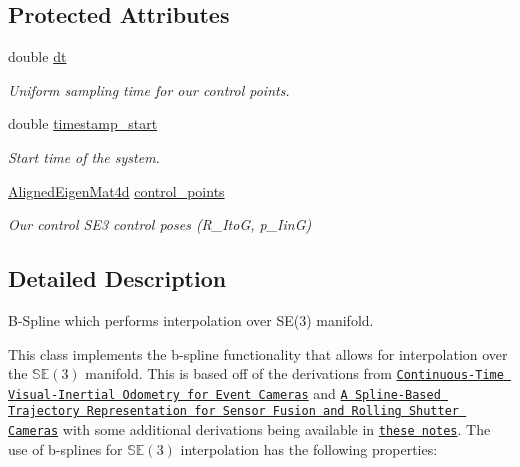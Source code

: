 \subsection*{Protected Attributes}
\begin{DoxyCompactItemize}
\item 
\mbox{\label{classov__core_1_1BsplineSE3_a48e22f59195971f19e93f27a9dd9f250}} 
double \hyperlink{classov__core_1_1BsplineSE3_a48e22f59195971f19e93f27a9dd9f250}{dt}
\begin{DoxyCompactList}\small\item\em Uniform sampling time for our control points. \end{DoxyCompactList}\item 
\mbox{\label{classov__core_1_1BsplineSE3_a3918570c18a61486c049a910c501d85a}} 
double \hyperlink{classov__core_1_1BsplineSE3_a3918570c18a61486c049a910c501d85a}{timestamp\+\_\+start}
\begin{DoxyCompactList}\small\item\em Start time of the system. \end{DoxyCompactList}\item 
\mbox{\label{classov__core_1_1BsplineSE3_a339afd2119785871db41799c3c5e2ec0}} 
\hyperlink{classov__core_1_1BsplineSE3_a2e0b3cb7cef84db7b84598f2ea01e00d}{Aligned\+Eigen\+Mat4d} \hyperlink{classov__core_1_1BsplineSE3_a339afd2119785871db41799c3c5e2ec0}{control\+\_\+points}
\begin{DoxyCompactList}\small\item\em Our control S\+E3 control poses (R\+\_\+\+ItoG, p\+\_\+\+IinG) \end{DoxyCompactList}\end{DoxyCompactItemize}


\subsection{Detailed Description}
B-\/\+Spline which performs interpolation over S\+E(3) manifold. 

This class implements the b-\/spline functionality that allows for interpolation over the $\mathbb{SE}(3)$ manifold. This is based off of the derivations from \href{https://ieeexplore.ieee.org/abstract/document/8432102/}{\tt Continuous-\/\+Time Visual-\/\+Inertial Odometry for Event Cameras} and \href{https://link.springer.com/article/10.1007/s11263-015-0811-3}{\tt A Spline-\/\+Based Trajectory Representation for Sensor Fusion and Rolling Shutter Cameras} with some additional derivations being available in \href{http://udel.edu/~pgeneva/downloads/notes/2018_notes_mueffler2017arxiv.pdf}{\tt these notes}. The use of b-\/splines for $\mathbb{SE}(3)$ interpolation has the following properties\+:



